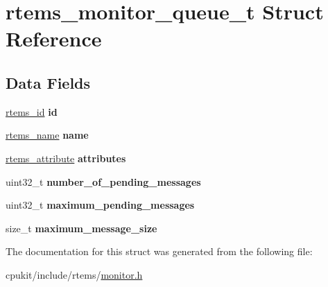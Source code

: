 \hypertarget{structrtems__monitor__queue__t}{}\section{rtems\+\_\+monitor\+\_\+queue\+\_\+t Struct Reference}
\label{structrtems__monitor__queue__t}
\subsection*{Data Fields}
\begin{DoxyCompactItemize}
\item 
\mbox{\label{structrtems__monitor__queue__t_a72fb0a4d2ae54be71b3b70e4e0b1cc38}} 
\mbox{\hyperlink{group__ClassicTasks_gab20892b814dced7dd4e5b9bf42becd57}{rtems\+\_\+id}} {\bfseries id}
\item 
\mbox{\label{structrtems__monitor__queue__t_a9615b4ca6063a15643c08cad06d3aff0}} 
\mbox{\hyperlink{group__ClassicTasks_ga55fb63c49f68c0cbd9bee004da15b1fd}{rtems\+\_\+name}} {\bfseries name}
\item 
\mbox{\label{structrtems__monitor__queue__t_a0a61b594797dd212f64dad2daf2e4957}} 
\mbox{\hyperlink{group__ClassicAttributes_gaea40313cf78ed843e09c4315d0a10f79}{rtems\+\_\+attribute}} {\bfseries attributes}
\item 
\mbox{\label{structrtems__monitor__queue__t_acac76e7c620f40eb068144a41a82ac86}} 
uint32\+\_\+t {\bfseries number\+\_\+of\+\_\+pending\+\_\+messages}
\item 
\mbox{\label{structrtems__monitor__queue__t_a34ceb6f4a2f84eef02332b455d58338a}} 
uint32\+\_\+t {\bfseries maximum\+\_\+pending\+\_\+messages}
\item 
\mbox{\label{structrtems__monitor__queue__t_aa4a5762b79b379f319ec04d1e3638891}} 
size\+\_\+t {\bfseries maximum\+\_\+message\+\_\+size}
\end{DoxyCompactItemize}


The documentation for this struct was generated from the following file\+:\begin{DoxyCompactItemize}
\item 
cpukit/include/rtems/\mbox{\hyperlink{monitor_8h}{monitor.\+h}}\end{DoxyCompactItemize}
